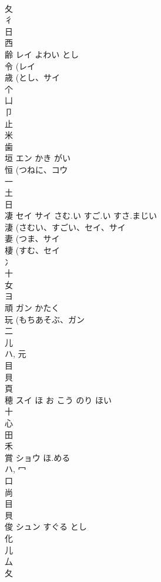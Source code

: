 \documentclass[8pt]{extreport}
\begin{document}
\begin{CJK}{UTF8}{min}
\\	夂 
\\	彳 
\\	日 
\\	西 
\\	齢	レイ	よわい とし	
\\	令 (レイ 
\\	歳 (とし、サイ 
\\	个 
\\	凵 
\\	卩 
\\	止 
\\	米 
\\	歯 
\\	垣	エン	かき がい	
\\	恒 (つねに、コウ 
\\	一 
\\	土 
\\	日 
\\	凄	セイ サイ	さむ.い すご.い すさ.まじい	
\\	淒 (さむい、すごい、セイ、サイ 
\\	妻 (つま、サイ 
\\	棲 (すむ、セイ 
\\	冫 
\\	十 
\\	女 
\\	ヨ	
\\	頑	ガン	かたく	
\\	玩 (もちあそぶ、ガン 
\\	二 
\\	儿 
\\	ハ, 元 
\\	目 
\\	貝 
\\	頁 
\\	穂	スイ	ほ お こう のり ほい	
\\	十 
\\	心 
\\	田 
\\	禾 
\\	賞	ショウ	ほ.める	
\\	ハ, 冖 
\\	口 
\\	尚 
\\	目 
\\	貝 
\\	俊	シュン	すぐる とし	
\\	化 
\\	儿 
\\	厶 
\\	夂 

\end{CJK}
\end{document}

